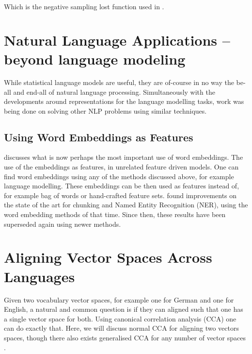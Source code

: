 \documentclass[parskip]{komatufte}
\begin{document}
Which is the negative sampling lost function used in  .







\section{Natural Language Applications -- beyond language modeling}
While statistical language models are useful, they are of-course in no way the be-all and end-all of natural language processing.
Simultaneously with the developments around representations for the language modelling tasks, work was being done on solving other NLP problems using similar techniques.



\subsection{Using Word Embeddings as Features}


 discusses what is now perhaps the most important use of word embeddings.
The use of the embeddings as features, in unrelated feature driven models.
One can find word embeddings using any of the methods discussed above, for example language modelling.
These embeddings can be then used as features instead of, for example bag of words or hand-crafted feature sets.
 found improvements on the state of the art for chunking and Named Entity Recognition (NER), using the word embedding methods of that time.
Since then, these results have been superseded again using newer methods.



\section{Aligning Vector Spaces Across Languages}
Given two vocabulary vector spaces, for example one for German and one for English,
a natural and common question is if they can aligned such that one has a single vector space for both.
Using canonical correlation analysis (CCA) one can do exactly that.
Here, we will discuss normal CCA for aligning two vectors spaces,
though there also exists generalised CCA for any number of vector spaces .
\end{document}
